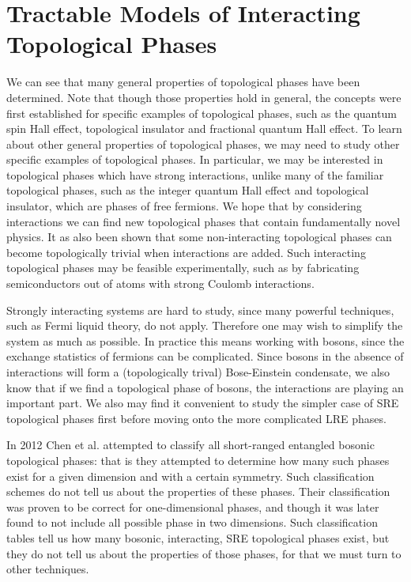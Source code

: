 \section{Tractable Models of Interacting Topological Phases}

	We can see that many general properties of topological phases have been determined. Note that though those properties hold in general, the concepts were first established for specific examples of topological phases, such as the quantum spin Hall effect, topological insulator and fractional quantum Hall effect. To learn about other general properties of topological phases, we may need to study other specific examples of topological phases. In particular, we may be interested in topological phases which have strong interactions, unlike many of the familiar topological phases, such as the integer quantum Hall effect and topological insulator, which are phases of free fermions. We hope that by considering interactions we can find new topological phases that contain fundamentally novel physics. It as also been shown that some non-interacting topological phases can become topologically trivial when interactions are added\cite{FidkowskiKitaev2011}. Such interacting topological phases may be feasible experimentally, such as by fabricating semiconductors out of atoms with strong Coulomb interactions\cite{something}. 

Strongly interacting systems are hard to study, since many powerful techniques, such as Fermi liquid theory, do not apply. Therefore one may wish to simplify the system as much as possible. In practice this means working with bosons, since the exchange statistics of fermions can be complicated. Since bosons in the absence of interactions will form a (topologically trival) Bose-Einstein condensate, we also know that if we find a topological phase of bosons, the interactions are playing an important part. We also may find it convenient to study the simpler case of SRE topological phases first before moving onto the more complicated LRE phases.

In 2012 Chen et al.\cite{WenScience,WenPRB} attempted to classify all short-ranged entangled bosonic topological phases: that is they attempted to determine how many such phases exist for a given dimension and with a certain symmetry. Such classification schemes do not tell us about the properties of these phases. Their classification was proven to be correct for one-dimensional phases, and though it was later found to not include all possible phase in two dimensions\cite{LuVishwanath,KapustinThorngren}. Such classification tables tell us how many bosonic, interacting, SRE topological phases exist, but they do not tell us about the properties of those phases, for that we must turn to other techniques.

